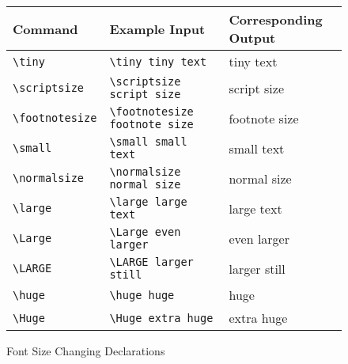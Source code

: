 \documentclass{article}
\begin{document}
\begin{figure}[H]
\caption{Font Size Changing Declarations}
\label{}
\begin{center}
    \begin{tabular}{l|l l}
    \toprule
    \textbf{Command} & \textbf{Example Input} & \textbf{Corresponding Output} \\
    \midrule
    \verb|\tiny| & \verb|\tiny tiny text| & \tiny tiny text \\
    \verb|\scriptsize| & \verb|\scriptsize script size| & \scriptsize script size \\
    \verb|\footnotesize| & \verb|\footnotesize footnote size| & \footnotesize footnote size \\
    \verb|\small| & \verb|\small small text| & \small small text \\
    \verb|\normalsize| & \verb|\normalsize normal size| & \normalsize normal size \\
    \verb|\large| & \verb|\large large text| & \large large text \\
    \verb|\Large| & \verb|\Large even larger| & \Large even larger \\
    \verb|\LARGE| & \verb|\LARGE larger still| & \LARGE larger still \\
    \verb|\huge| & \verb|\huge huge| & \huge huge \\
    \verb|\Huge| & \verb|\Huge extra huge| & \Huge extra huge \\
    \bottomrule
    \end{tabular}
\end{center}
\end{figure}
\end{document}
